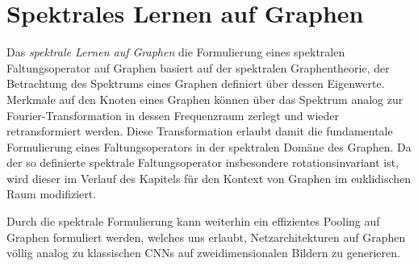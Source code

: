 \chapter{Spektrales Lernen auf Graphen}
\label{spektrales_lernen}

Das \emph{spektrale Lernen auf Graphen} \bzw{} die Formulierung eines spektralen Faltungsoperator auf Graphen basiert auf der spektralen Graphentheorie, \dhe{} der Betrachtung des Spektrums eines Graphen definiert über dessen Eigenwerte.
Merkmale auf den Knoten eines Graphen können über das Spektrum analog zur Fourier-Transformation in dessen Frequenzraum zerlegt und wieder retransformiert werden.
Diese Transformation erlaubt damit die fundamentale Formulierung eines Faltungsoperators in der spektralen Domäne des Graphen.
Da der so definierte spektrale Faltungsoperator insbesondere rotationsinvariant ist, wird dieser im Verlauf des Kapitels für den Kontext von Graphen im euklidischen Raum modifiziert.

Durch die spektrale Formulierung kann weiterhin ein effizientes Pooling auf Graphen formuliert werden, welches uns erlaubt, Netzarchitekturen auf Graphen völlig analog zu klassischen \glspl{CNN} auf zweidimensionalen Bildern zu generieren.







